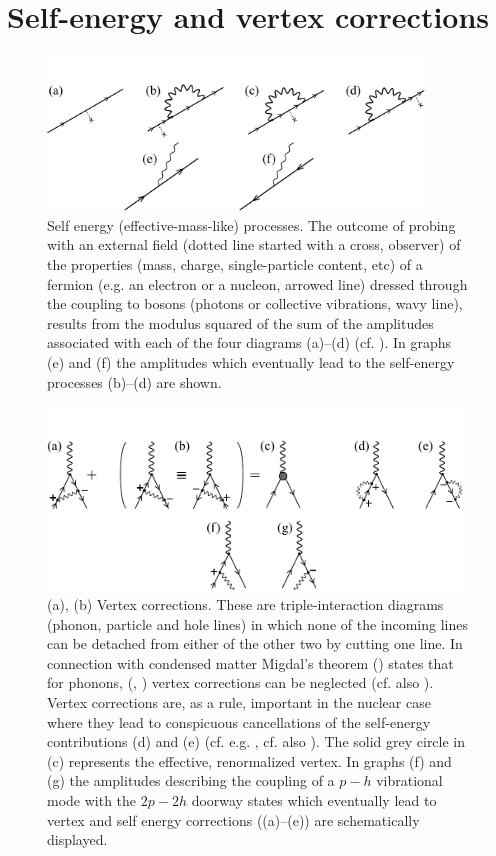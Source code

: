 \section{Self-energy and vertex corrections}\label{C6AppD}
 \begin{figure}
\centerline{\includegraphics*[width=10cm,angle=0]{C6/figs_C6/fig6_C1xx}}
\caption{Self energy (effective-mass-like) processes. The outcome of probing with an external field (dotted line started with a cross, observer) of the properties (mass, charge, single-particle content, etc) of a fermion (e.g. an electron or a nucleon, arrowed line) dressed through the coupling to  bosons (photons or collective vibrations, wavy line), results from the modulus squared of the sum of the amplitudes associated with each of the four diagrams (a)--(d) (cf. \citep{Feynman:75}). In graphs (e) and (f) the amplitudes which eventually lead to the self-energy processes (b)--(d) are shown.}\label{fig6_D1}
\end{figure}
 \begin{figure}
\centerline{\includegraphics*[width=11cm,angle=0]{C6/figs_C6/fig6_C2xx}}
\caption{(a), (b) Vertex corrections. These are triple-interaction  diagrams (phonon, particle and hole lines) in which none of the incoming lines can be detached from either of the other two by cutting one line. In connection with condensed matter Migdal's theorem  (\cite{Migdal:58}) states that for phonons, (\cite{Bardeen:55},  \cite{Frohlich:52}) vertex corrections can be neglected (cf. also \cite{Anderson:64}). Vertex corrections are, as a rule, important in the nuclear case where they lead to conspicuous cancellations of the self-energy contributions (d) and (e) (cf. e.g. \cite{Bortignon:83}, cf. also \cite{Anderson:64}). The solid grey circle in (c) represents the effective, renormalized vertex. In graphs (f) and (g) the amplitudes describing the coupling of a $p-h$ vibrational mode with the $2p-2h$ doorway states which eventually lead to  vertex  and self energy corrections  ((a)--(e)) are schematically displayed.}\label{fig6_D2}
\end{figure}

